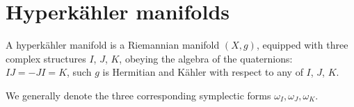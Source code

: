 \documentclass[12pt,letterpaper,reqno]{amsart}
\numberwithin{equation}{section}
\newcommand{\kahler}{K\"ahler\xspace}
\newcommand{\hk}{hyperk\"ahler\xspace}
\newcommand{\fixme}[1]{{\color{blue}{[#1]}}}
\begin{document}
\fixme{reduced holonomy}


\section{Hyperk\"ahler manifolds}

\begin{defn} A \hk manifold is a Riemannian 
manifold $(X,g)$,
equipped with three complex structures $I$, $J$, $K$, obeying the algebra of the quaternions: $IJ = -JI = K$,
such $g$ is Hermitian and \kahler with respect to
any of $I$, $J$, $K$.
\end{defn}

We generally denote the three corresponding
symplectic forms $\omega_I, \omega_J, \omega_K$.

\fixme{reduced holonomy}

\fixme{Ricci-flatness}


\printbibliography
\end{document}
